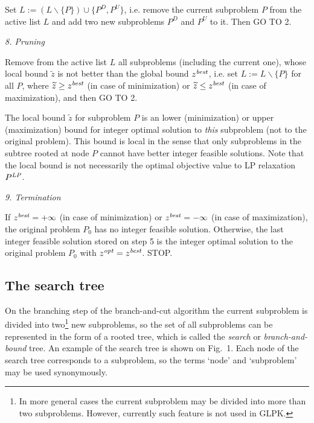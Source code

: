Set $L:=(L\backslash\{P\})\cup\{P^D,P^U\}$, i.e. remove the current
subproblem $P$ from the active list $L$ and add two new subproblems
$P^D$ and $P^U$ to it. Then GO TO 2.

\medskip

{\it 8. Pruning}

Remove from the active list $L$ all subproblems (including the current
one), whose local bound $\widetilde{z}$ is not better than the global
bound $z^{\it best}$, i.e. set $L:=L\backslash\{P\}$ for all $P$, where
$\widetilde{z}\geq z^{\it best}$ (in case of minimization) or
$\widetilde{z}\leq z^{\it best}$ (in case of maximization), and then
GO TO 2.

The local bound $\widetilde{z}$ for subproblem $P$ is an lower
(minimization) or upper (maximization) bound for integer optimal
solution to {\it this} subproblem (not to the original problem). This
bound is local in the sense that only subproblems in the subtree rooted
at node $P$ cannot have better integer feasible solutions. Note that
the local bound is not necessarily the optimal objective value to LP
relaxation $P^{\it LP}$.

\medskip

{\it 9. Termination}

If $z^{\it best}=+\infty$ (in case of minimization) or
$z^{\it best}=-\infty$ (in case of maximization), the original problem
$P_0$ has no integer feasible solution. Otherwise, the last integer
feasible solution stored on step 5 is the integer optimal solution to
the original problem $P_0$ with $z^{\it opt}=z^{\it best}$. STOP.

\subsection{The search tree}

On the branching step of the branch-and-cut algorithm the current
subproblem is divided into two\footnote{In more general cases the
current subproblem may be divided into more than two subproblems.
However, currently such feature is not used in GLPK.} new subproblems,
so the set of all subproblems can be represented in the form of a rooted
tree, which is called the {\it search} or {\it branch-and-bound} tree.
An example of the search tree is shown on Fig.~1. Each node of the
search tree corresponds to a subproblem, so the terms `node' and
`subproblem' may be used synonymously.

\newpage

